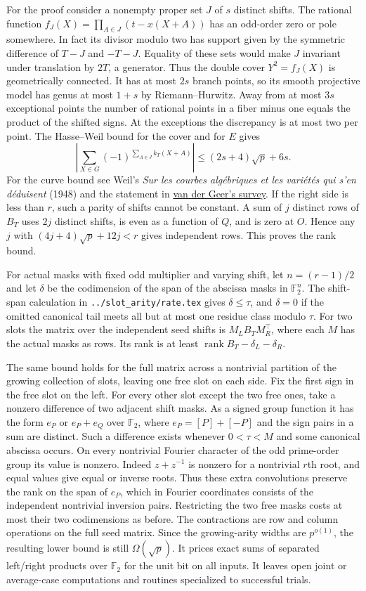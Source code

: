\documentclass[11pt]{article}
\newcommand{\F}{\mathbb F}
\begin{document}
For the proof consider a nonempty proper set $J$ of $s$ distinct
shifts. The rational function
$f_J(X)=\prod_{A\in J}(t-x(X+A))$ has an odd-order zero or pole
somewhere. In fact its divisor modulo two has support given by
the symmetric difference of $T-J$ and $-T-J$. Equality of these
sets would make $J$ invariant under translation by $2T$, a
generator. Thus the double cover $Y^2=f_J(X)$ is geometrically
connected. It has at most $2s$ branch points, so its smooth
projective model has genus at most $1+s$ by Riemann--Hurwitz.
Away from at most $3s$ exceptional points the number of rational
points in a fiber minus one equals the product of the shifted
signs. At the exceptions the discrepancy is at most two per
point. The Hasse--Weil bound for the cover and for $E$ gives
\[
 \left|\sum_{X\in G}(-1)^{\sum_{A\in J}k_T(X+A)}\right|
 \le (2s+4)\sqrt p+6s .
\]
For the curve bound see Weil's \emph{Sur les courbes alg\'ebriques
et les vari\'et\'es qui s'en d\'eduisent} (1948) and the statement in
\href{https://arxiv.org/abs/1409.6090}{van der Geer's survey}.
If the right side is less than $r$, such a parity of shifts cannot
be constant. A sum of $j$ distinct rows of $B_T$ uses $2j$
distinct shifts, is even as a function of $Q$, and is zero at $O$.
Hence any $j$ with $(4j+4)\sqrt p+12j<r$ gives independent
rows. This proves the rank bound.

For actual masks with fixed odd multiplier and varying shift, let
$n=(r-1)/2$ and let $\delta$ be the codimension of the span of
the abscissa masks in $\F_2^n$. The shift-span calculation in
\texttt{../slot\_arity/rate.tex} gives $\delta\le\tau$, and
$\delta=0$ if the omitted canonical tail meets all but at most one
residue class modulo $\tau$. For two slots the matrix over the
independent seed shifts is $M_L B_T M_R^\top$, where each $M$
has the actual masks as rows. Its rank is at least
$\operatorname{rank}B_T-\delta_L-\delta_R$.

The same bound holds for the full matrix across a nontrivial
partition of the growing collection of slots, leaving one free
slot on each side. Fix the first sign in the free slot on the
left. For every other slot except the two free ones, take a
nonzero difference of two adjacent shift masks. As a signed
group function it has the form $e_P$ or $e_P+e_Q$ over $\F_2$,
where $e_P=[P]+[-P]$ and the sign pairs in a sum are distinct.
Such a difference exists whenever $0<\tau<M$ and some canonical
abscissa occurs. On every nontrivial Fourier character of the
odd prime-order group its value is nonzero. Indeed $z+z^{-1}$
is nonzero for a nontrivial $r$th root, and equal values give
equal or inverse roots. Thus these extra convolutions preserve the
rank on the span of $e_P$, which in Fourier coordinates consists
of the independent nontrivial inversion pairs. Restricting the
two free masks costs at most their two codimensions as before.
The contractions are row and column operations on the full
seed matrix. Since the growing-arity widths are $p^{o(1)}$,
the resulting lower bound is still $\Omega(\sqrt p)$.
It prices exact sums of separated left/right products over
$\F_2$ for the unit bit on all inputs. It leaves open joint or
average-case computations and routines specialized to successful trials.
\end{document}
